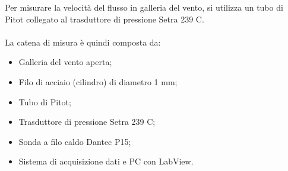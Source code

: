 \noindent Per misurare la velocità del flusso in galleria del vento, si utilizza un tubo di Pitot collegato al trasduttore di pressione Setra 239 C.\\\\
La catena di misura è quindi composta da:
\begin{itemize}
    \item Galleria del vento aperta;
    \item Filo di acciaio (cilindro) di diametro 1 mm;
    \item Tubo di Pitot;
    \item Trasduttore di pressione Setra 239 C;
    \item Sonda a filo caldo Dantec P15;
    \item Sistema di acquisizione dati e PC con LabView.
\end{itemize}

